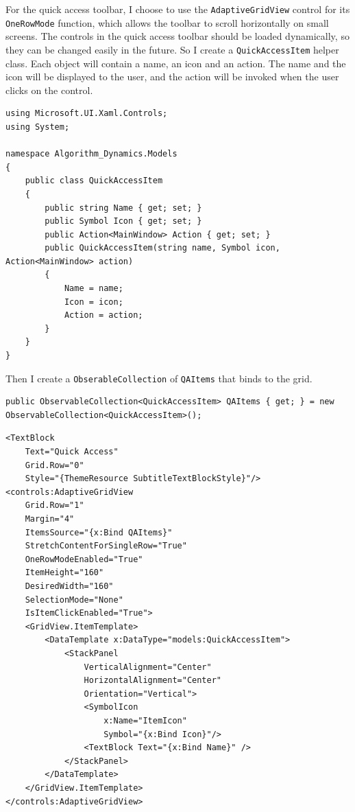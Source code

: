 \documentclass[a4paper]{report}
\begin{document}
For the quick access toolbar, I choose to use the \texttt{AdaptiveGridView} control for its \texttt{OneRowMode} function, which allows the toolbar to scroll horizontally on small screens. The controls in the quick access toolbar should be loaded dynamically, so they can be changed easily in the future. So I create a \texttt{QuickAccessItem} helper class. Each object will contain a name, an icon and an action. The name and the icon will be displayed to the user, and the action will be invoked when the user clicks on the control.

\begin{verbatim}
using Microsoft.UI.Xaml.Controls;
using System;

namespace Algorithm_Dynamics.Models
{
    public class QuickAccessItem
    {
        public string Name { get; set; }
        public Symbol Icon { get; set; }
        public Action<MainWindow> Action { get; set; }
        public QuickAccessItem(string name, Symbol icon, Action<MainWindow> action)
        {
            Name = name;
            Icon = icon;
            Action = action;
        }
    }
}
\end{verbatim}

Then I create a \texttt{ObserableCollection} of \texttt{QAItems} that binds to the grid.

\begin{verbatim}
public ObservableCollection<QuickAccessItem> QAItems { get; } = new ObservableCollection<QuickAccessItem>();
\end{verbatim}

\begin{verbatim}
<TextBlock 
    Text="Quick Access"
    Grid.Row="0"
    Style="{ThemeResource SubtitleTextBlockStyle}"/>
<controls:AdaptiveGridView 
    Grid.Row="1"
    Margin="4"
    ItemsSource="{x:Bind QAItems}"
    StretchContentForSingleRow="True"
    OneRowModeEnabled="True"
    ItemHeight="160"
    DesiredWidth="160"
    SelectionMode="None"
    IsItemClickEnabled="True">
    <GridView.ItemTemplate>
        <DataTemplate x:DataType="models:QuickAccessItem">
            <StackPanel 
                VerticalAlignment="Center"
                HorizontalAlignment="Center"
                Orientation="Vertical">
                <SymbolIcon 
                    x:Name="ItemIcon"
                    Symbol="{x:Bind Icon}"/>
                <TextBlock Text="{x:Bind Name}" />
            </StackPanel>
        </DataTemplate>
    </GridView.ItemTemplate>
</controls:AdaptiveGridView>
\end{verbatim}
\end{document}

